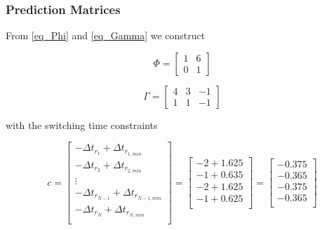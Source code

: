 \subsubsection{Prediction Matrices}

From \eqref{eq_Phi} and \eqref{eq_Gamma} we construct

\begin{equation}
    \Phi =
    \left[
    \begin{matrix}
        1 & 6 \\
        0 & 1
    \end{matrix}
    \right]
\end{equation}

\begin{equation}
    \Gamma =
    \left[
    \begin{matrix}
        4 & 3 & -1 \\
        1 & 1 & -1
    \end{matrix}
    \right]
\end{equation}

\noindent
with the switching time constraints

\begin{equation}
    c = 
    \left[
        \begin{matrix}
            -\Delta t_{r_1} + \Delta t_{r_{1, min}} \\
            -\Delta t_{r_2} + \Delta t_{r_{2, min}} \\
            \vdots \\
            -\Delta t_{r_{N-1}} + \Delta t_{r_{{N-1}, min}} \\
            -\Delta t_{r_N} + \Delta t_{r_{N, min}} \\
        \end{matrix}
    \right] = 
    \left[
        \begin{matrix}
            - 2 + 1.625 \\
            - 1 + 0.635 \\
            - 2 + 1.625 \\
            - 1 + 0.625 \\
        \end{matrix}
    \right] =
    \left[
        \begin{matrix}
            - 0.375 \\
            - 0.365 \\
            - 0.375 \\
            - 0.365 \\
        \end{matrix}
    \right]
\end{equation}

